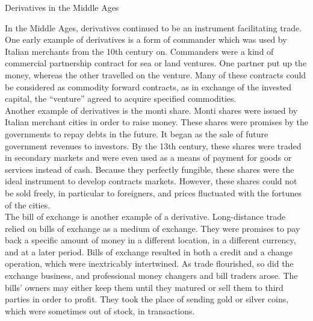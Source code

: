 \documentclass[unknownkeysallowed, compress]{beamer}
\theoremstyle{plain}
\begin{document}
\begin{frame}[allowframebreaks]{Derivatives in the Middle Ages}
\noindent
\par In the Middle Ages, derivatives continued to be an instrument facilitating trade.
One early example of derivatives is a form of commander which was used by Italian
merchants from the 10th century on. Commanders were a kind of commercial
partnership contract for sea or land ventures. One partner put up the money, whereas
the other travelled on the venture. Many of these contracts could be considered as
commodity forward contracts, as in exchange of the invested capital, the ``venture''
agreed to acquire specified commodities.\\
Another example of derivatives is the monti share. Monti shares were issued by Italian
merchant cities in order to raise money. These shares were promises by the governments
to repay debts in the future. It began as the sale of future government revenues to
investors. By the 13th century, these shares were traded in secondary markets and were
even used as a means of payment for goods or services instead of cash. Because they
perfectly fungible, these shares were the ideal instrument to develop contracts markets.
However, these shares could not be sold freely, in particular to foreigners, and prices
fluctuated with the fortunes of the cities.\\
The bill of exchange is another example of a derivative. Long-distance trade relied on bills
of exchange as a medium of exchange. They were promises to pay back a specific amount
of money in a different location, in a different currency, and at a later period. Bills of
exchange resulted in both a credit and a change operation, which were inextricably
intertwined. As trade flourished, so did the exchange business, and professional money
changers and bill traders arose. The bills' owners may either keep them until they
matured or sell them to third parties in order to profit. They took the place of sending
gold or silver coins, which were sometimes out of stock, in transactions.

\end{frame}
\end{document}
